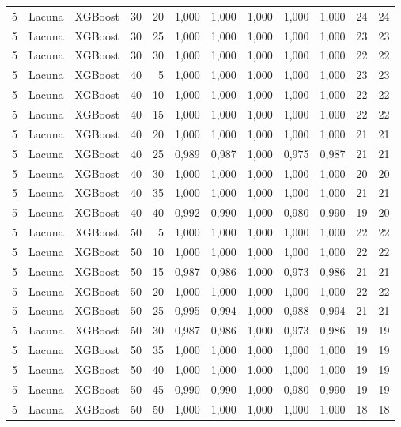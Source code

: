 \begin{longtable}{@{}rllrrrrrrrrr@{}}
5 & Lacuna & XGBoost & 30 & 20 & 1,000 & 1,000 & 1,000 & 1,000 & 1,000 & 24 & 24 \\
5 & Lacuna & XGBoost & 30 & 25 & 1,000 & 1,000 & 1,000 & 1,000 & 1,000 & 23 & 23 \\
5 & Lacuna & XGBoost & 30 & 30 & 1,000 & 1,000 & 1,000 & 1,000 & 1,000 & 22 & 22 \\
5 & Lacuna & XGBoost & 40 & 5 & 1,000 & 1,000 & 1,000 & 1,000 & 1,000 & 23 & 23 \\
5 & Lacuna & XGBoost & 40 & 10 & 1,000 & 1,000 & 1,000 & 1,000 & 1,000 & 22 & 22 \\
5 & Lacuna & XGBoost & 40 & 15 & 1,000 & 1,000 & 1,000 & 1,000 & 1,000 & 22 & 22 \\
5 & Lacuna & XGBoost & 40 & 20 & 1,000 & 1,000 & 1,000 & 1,000 & 1,000 & 21 & 21 \\
5 & Lacuna & XGBoost & 40 & 25 & 0,989 & 0,987 & 1,000 & 0,975 & 0,987 & 21 & 21 \\
5 & Lacuna & XGBoost & 40 & 30 & 1,000 & 1,000 & 1,000 & 1,000 & 1,000 & 20 & 20 \\
5 & Lacuna & XGBoost & 40 & 35 & 1,000 & 1,000 & 1,000 & 1,000 & 1,000 & 21 & 21 \\
5 & Lacuna & XGBoost & 40 & 40 & 0,992 & 0,990 & 1,000 & 0,980 & 0,990 & 19 & 20 \\
5 & Lacuna & XGBoost & 50 & 5 & 1,000 & 1,000 & 1,000 & 1,000 & 1,000 & 22 & 22 \\
5 & Lacuna & XGBoost & 50 & 10 & 1,000 & 1,000 & 1,000 & 1,000 & 1,000 & 22 & 22 \\
5 & Lacuna & XGBoost & 50 & 15 & 0,987 & 0,986 & 1,000 & 0,973 & 0,986 & 21 & 21 \\
5 & Lacuna & XGBoost & 50 & 20 & 1,000 & 1,000 & 1,000 & 1,000 & 1,000 & 22 & 22 \\
5 & Lacuna & XGBoost & 50 & 25 & 0,995 & 0,994 & 1,000 & 0,988 & 0,994 & 21 & 21 \\
5 & Lacuna & XGBoost & 50 & 30 & 0,987 & 0,986 & 1,000 & 0,973 & 0,986 & 19 & 19 \\
5 & Lacuna & XGBoost & 50 & 35 & 1,000 & 1,000 & 1,000 & 1,000 & 1,000 & 19 & 19 \\
5 & Lacuna & XGBoost & 50 & 40 & 1,000 & 1,000 & 1,000 & 1,000 & 1,000 & 19 & 19 \\
5 & Lacuna & XGBoost & 50 & 45 & 0,990 & 0,990 & 1,000 & 0,980 & 0,990 & 19 & 19 \\
5 & Lacuna & XGBoost & 50 & 50 & 1,000 & 1,000 & 1,000 & 1,000 & 1,000 & 18 & 18 \\

\end{longtable}
